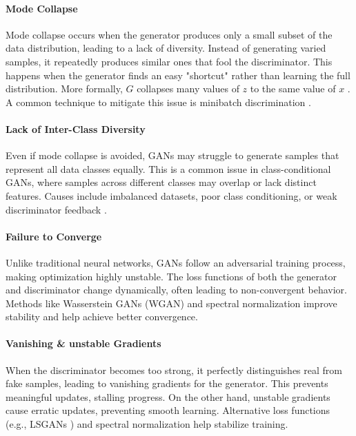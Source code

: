 \paragraph[Mode Collapse]{Mode Collapse}
Mode collapse occurs when the generator produces only a small subset of the data distribution, leading to a lack of diversity. Instead of generating varied samples, it repeatedly produces similar ones that fool the discriminator. This happens when the generator finds an easy "shortcut" rather than learning the full distribution. More formally, \(G\) collapses many values of \(z\) to the same value of \(x\) \cite{goodfellow2014generativeadversarialnetworks}. A common technique to mitigate this issue is  minibatch discrimination \cite{salimans2016improvedtechniquestraininggans}. %
\paragraph[Lack of Inter-Class Diversity]{Lack of Inter-Class Diversity}
Even if mode collapse is avoided, GANs may struggle to generate samples that represent all data classes equally. This is a common issue in class-conditional GANs, where samples across different classes may overlap or lack distinct features. Causes include imbalanced datasets, poor class conditioning, or weak discriminator feedback \cite{Odena201710.5555/3305890.3305954}.
\paragraph[Failure to Converge]{Failure to Converge}
Unlike traditional neural networks, GANs follow an adversarial training process, making optimization highly unstable. The loss functions of both the generator and discriminator change dynamically, often leading to non-convergent behavior. Methods like Wasserstein GANs (WGAN) \cite{arjovsky2017wassersteingan} and spectral normalization \cite{miyato2018spectralnormalizationgenerativeadversarial} improve stability and help achieve better convergence.
\paragraph[Vanishing & unstable Gradients]{Vanishing \& unstable Gradients}
When the discriminator becomes too strong, it perfectly distinguishes real from fake samples, leading to vanishing gradients for the generator. This prevents meaningful updates, stalling progress. On the other hand, unstable gradients cause erratic updates, preventing smooth learning. Alternative loss functions (e.g., LSGANs \cite{mao2017squaresgenerativeadversarialnetworks}) and spectral normalization help stabilize training.
